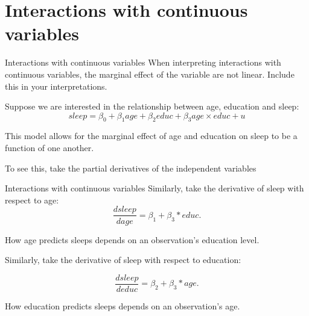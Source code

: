 \documentclass[
  ignorenonframetext,
]{beamer}
\begin{document}
\hypertarget{interactions-with-continuous-variables}{%
\section{Interactions with continuous
variables}\label{interactions-with-continuous-variables}}

\begin{frame}{Interactions with continuous variables}
\protect\hypertarget{interactions-with-continuous-variables-1}{}
When interpreting interactions with continuous variables, the marginal
effect of the variable are not linear. Include this in your
interpretations.

Suppose we are interested in the relationship between age, education and
sleep: \[
sleep=\beta_0+\beta_1 age+\beta_2 educ+\beta_3 age \times educ+u
\]

This model allows for the marginal effect of age and education on sleep
to be a function of one another.

To see this, take the partial derivatives of the independent variables
\end{frame}

\begin{frame}{Interactions with continuous variables}
\protect\hypertarget{interactions-with-continuous-variables-2}{}
Similarly, take the derivative of sleep with respect to age: \[
\frac{dsleep}{dage}=\beta_1+\beta_3*educ.
\]

How age predicts sleeps depends on an observation's education level.

Similarly, take the derivative of sleep with respect to education:

\[
\frac{dsleep}{deduc}=\beta_2+\beta_3*age.
\]

How education predicts sleeps depends on an observation's age.
\end{frame}
\end{document}
